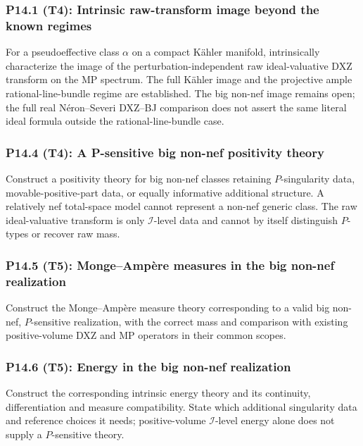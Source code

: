 \documentclass[11pt,a4paper]{article}
\theoremstyle{definition}
\theoremstyle{remark}
\begin{document}
\subsubsection*{P14.1 (T4): Intrinsic raw-transform image beyond the known regimes}
\label{atom:P14.1}
For a pseudoeffective class \(\alpha\) on a compact K\"ahler manifold, intrinsically characterize the image of the perturbation-independent raw ideal-valuative DXZ transform on the MP spectrum. The full K\"ahler image and the projective ample rational-line-bundle regime are established. The big non-nef image remains open; the full real N\'eron--Severi DXZ--BJ comparison does not assert the same literal ideal formula outside the rational-line-bundle case.

\subsubsection*{P14.4 (T4): A P-sensitive big non-nef positivity theory}
\label{atom:P14.4}
Construct a positivity theory for big non-nef classes retaining \(P\)-singularity data, movable-positive-part data, or equally informative additional structure. A relatively nef total-space model cannot represent a non-nef generic class. The raw ideal-valuative transform is only \(\mathcal I\)-level data and cannot by itself distinguish \(P\)-types or recover raw mass.

\subsubsection*{P14.5 (T5): Monge--Ampère measures in the big non-nef realization}
\label{atom:P14.5}
Construct the Monge--Ampère measure theory corresponding to a valid big non-nef, \(P\)-sensitive realization, with the correct mass and comparison with existing positive-volume DXZ and MP operators in their common scopes.

\subsubsection*{P14.6 (T5): Energy in the big non-nef realization}
\label{atom:P14.6}
Construct the corresponding intrinsic energy theory and its continuity, differentiation and measure compatibility. State which additional singularity data and reference choices it needs; positive-volume \(\mathcal I\)-level energy alone does not supply a \(P\)-sensitive theory.
\end{document}
